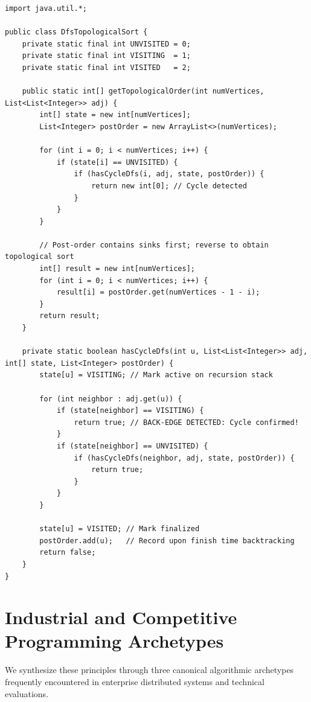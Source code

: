 \documentclass[10pt,journal,compsoc,onecolumn]{IEEEtran}
\begin{document}
\begin{lstlisting}[caption={DFS Topological Sort with 3-Color State Machine}, label={lst:dfs_topo}]
import java.util.*;

public class DfsTopologicalSort {
    private static final int UNVISITED = 0;
    private static final int VISITING  = 1;
    private static final int VISITED   = 2;

    public static int[] getTopologicalOrder(int numVertices, List<List<Integer>> adj) {
        int[] state = new int[numVertices];
        List<Integer> postOrder = new ArrayList<>(numVertices);

        for (int i = 0; i < numVertices; i++) {
            if (state[i] == UNVISITED) {
                if (hasCycleDfs(i, adj, state, postOrder)) {
                    return new int[0]; // Cycle detected
                }
            }
        }

        // Post-order contains sinks first; reverse to obtain topological sort
        int[] result = new int[numVertices];
        for (int i = 0; i < numVertices; i++) {
            result[i] = postOrder.get(numVertices - 1 - i);
        }
        return result;
    }

    private static boolean hasCycleDfs(int u, List<List<Integer>> adj, int[] state, List<Integer> postOrder) {
        state[u] = VISITING; // Mark active on recursion stack

        for (int neighbor : adj.get(u)) {
            if (state[neighbor] == VISITING) {
                return true; // BACK-EDGE DETECTED: Cycle confirmed!
            }
            if (state[neighbor] == UNVISITED) {
                if (hasCycleDfs(neighbor, adj, state, postOrder)) {
                    return true;
                }
            }
        }

        state[u] = VISITED; // Mark finalized
        postOrder.add(u);   // Record upon finish time backtracking
        return false;
    }
}
\end{lstlisting}

\section{Industrial and Competitive Programming Archetypes}
\label{sec:archetypes}

We synthesize these principles through three canonical algorithmic archetypes frequently encountered in enterprise distributed systems and technical evaluations.
\end{document}
